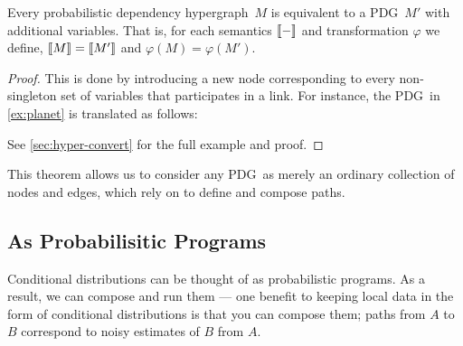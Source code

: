 \documentclass{article}
\newcommand\Set{\textbf{Set}}
\newcommand{\modelnamehyper}{probabilistic dependency hypergraph}
\newcommand{\MN}{PDG}
\begin{document}
	\begin{theorem}[restate=thmhyperequiv]\label{thm:hyperequiv}
		Every \modelnamehyper\ $M$ is equivalent to a \MN\ $M'$ with additional variables. That is, for each semantics $\llbracket-\rrbracket$ and transformation $\varphi$ we define, $\llbracket M\rrbracket = \llbracket M'\rrbracket$ and $\varphi(M) = \varphi(M')$.
	\end{theorem}
	\begin{proof}
		This is done by introducing a new node corresponding to every non-singleton set of variables that participates in a link. For instance, the \MN\ in \cref{ex:planet} is translated as follows:
		\begin{center}
		\end{center}
		See \cref{sec:hyper-convert} for the full example and proof.
	\end{proof}
	
	This theorem allows us to consider any \MN\ as merely an ordinary collection of nodes and edges, which rely on to define and compose paths.
	

	
	
	\subsection{As Probabilisitic Programs}\label{sec:prog-semantics}
	
	Conditional distributions can be thought of as probabilistic programs. As a result, we can compose and run them --- one  benefit to keeping local data in the form of conditional distributions is that you can compose them; paths from $A$ to $B$ correspond to noisy estimates of $B$ from $A$.
	
\end{document}
